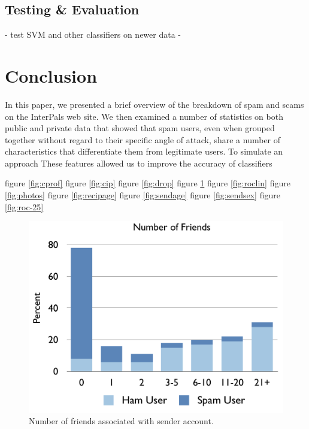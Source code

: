 \documentclass[preprint]{acm_proc_article-sp}
\begin{document}
\begin{tabular}
{\subsection{Testing \& Evaluation}

- test SVM and other classifiers on newer data
- 

\section{Conclusion}

In this paper, we presented a brief overview of the breakdown of spam and scams on the InterPals web site. 
We then examined a number of statistics on both public and private data that showed that spam users, even when 
grouped together without regard to their specific angle of attack, share a number of characteristics that differentiate 
them from legitimate users. To simulate an approach 
These features allowed us to improve the accuracy of classifiers



figure \ref{fig:cprof}
figure \ref{fig:cip}
figure \ref{fig:drop}
figure \ref{fig:friends}
figure \ref{fig:roclin}
figure \ref{fig:photos}
figure \ref{fig:recipage}
figure \ref{fig:sendage}
figure \ref{fig:sendsex}
figure \ref{fig:roc-25}

\begin{figure}[h]
    \centering
    \includegraphics[width=\linewidth]{figures/friends.pdf}
    \caption{Number of friends associated with sender account.}
    \label{fig:friends}
\end{figure}


}
\end{tabular}
\end{document}
